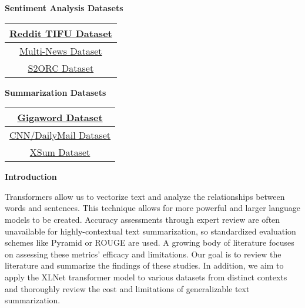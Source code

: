 \begin{multicols}{2}
    \begin{center}
        \begin{large}
            \noindent\textbf{Sentiment Analysis Datasets}
        \end{large}
    \end{center}

    \begin{center}
        \begin{tabular}{|c|}
            \hline
            \href{https://paperswithcode.com/dataset/reddit-tifu}{Reddit TIFU Dataset} \\ \hline
            \href{https://paperswithcode.com/dataset/multi-news}{Multi-News Dataset} \\ \hline
            \href{https://paperswithcode.com/dataset/s2orc}{S2ORC Dataset} \\ \hline
        \end{tabular}
    \end{center}

    \begin{center}
        \begin{large}
            \noindent\textbf{Summarization Datasets}
        \end{large}
    \end{center}

    \begin{center}
        \begin{tabular}{|c|}
            \hline
            \href{https://huggingface.co/datasets/gigaword}{Gigaword Dataset} \\ \hline
            \href{https://huggingface.co/datasets/cnn_dailymail}{CNN/DailyMail Dataset} \\ \hline
            \href{https://huggingface.co/datasets/xsum}{XSum Dataset} \\ \hline
        \end{tabular}
    \end{center}

\end{multicols}

\begin{large}
    \noindent\textbf{Introduction}
\end{large}

\vspace{5pt}

Transformers allow us to vectorize text and analyze the relationships between words and sentences.
This technique allows for more powerful and larger language models to be created.
Accuracy assessments through expert review are often unavailable for highly-contextual text summarization, so standardized evaluation schemes like Pyramid or ROUGE are used.
A growing body of literature focuses on assessing these metrics' efficacy and limitations.
Our goal is to review the literature and summarize the findings of these studies.
In addition, we aim to apply the XLNet transformer model to various datasets from distinct contexts and thoroughly review the cost and limitations of generalizable text summarization.

